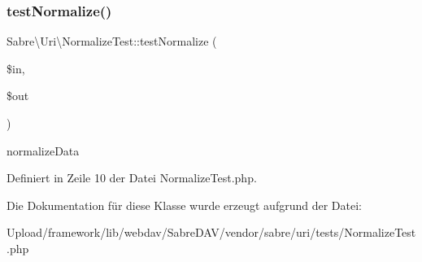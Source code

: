 \subsubsection{\texorpdfstring{test\+Normalize()}{testNormalize()}}
{\footnotesize\ttfamily Sabre\textbackslash{}\+Uri\textbackslash{}\+Normalize\+Test\+::test\+Normalize (\begin{DoxyParamCaption}\item[{}]{\$in,  }\item[{}]{\$out }\end{DoxyParamCaption})}

normalize\+Data 

Definiert in Zeile 10 der Datei Normalize\+Test.\+php.



Die Dokumentation für diese Klasse wurde erzeugt aufgrund der Datei\+:\begin{DoxyCompactItemize}
\item 
Upload/framework/lib/webdav/\+Sabre\+D\+A\+V/vendor/sabre/uri/tests/Normalize\+Test.\+php\end{DoxyCompactItemize}
